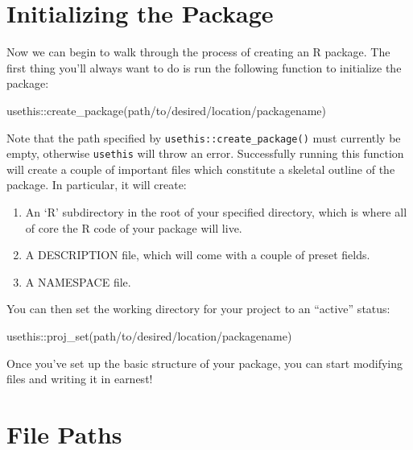 \documentclass[
]{book}
\newenvironment{Shaded}{\begin{snugshade}}{\end{snugshade}}
\newcommand{\FunctionTok}[1]{\textcolor[rgb]{0.00,0.00,0.00}{#1}}
\newcommand{\NormalTok}[1]{#1}
\newcommand{\SpecialCharTok}[1]{\textcolor[rgb]{0.00,0.00,0.00}{#1}}
\newcommand{\StringTok}[1]{\textcolor[rgb]{0.31,0.60,0.02}{#1}}
\providecommand{\tightlist}{%
  \setlength{\itemsep}{0pt}\setlength{\parskip}{0pt}}
\begin{document}
\hypertarget{initializing-the-package}{%
\section{Initializing the Package}\label{initializing-the-package}}

Now we can begin to walk through the process of creating an R package. The first thing you'll always want to do is run the following function to initialize the package:

\begin{Shaded}
\begin{Highlighting}[]
\NormalTok{usethis}\SpecialCharTok{::}\FunctionTok{create\_package}\NormalTok{(}\StringTok{\textquotesingle{}path/to/desired/location/packagename\textquotesingle{}}\NormalTok{)}
\end{Highlighting}
\end{Shaded}

Note that the path specified by \texttt{usethis::create\_package()} must currently be empty, otherwise \texttt{usethis} will throw an error. Successfully running this function will create a couple of important files which constitute a skeletal outline of the package. In particular, it will create:

\begin{enumerate}
\def\labelenumi{\arabic{enumi}.}
\tightlist
\item
  An `R' subdirectory in the root of your specified directory, which is where all of core the R code of your package will live.
\item
  A DESCRIPTION file, which will come with a couple of preset fields.
\item
  A NAMESPACE file.
\end{enumerate}

You can then set the working directory for your project to an ``active'' status:

\begin{Shaded}
\begin{Highlighting}[]
\NormalTok{usethis}\SpecialCharTok{::}\FunctionTok{proj\_set}\NormalTok{(}\StringTok{\textquotesingle{}path/to/desired/location/packagename\textquotesingle{}}\NormalTok{)}
\end{Highlighting}
\end{Shaded}

Once you've set up the basic structure of your package, you can start modifying files and writing it in earnest!

\hypertarget{file-paths}{%
\section{File Paths}\label{file-paths}}
\end{document}
